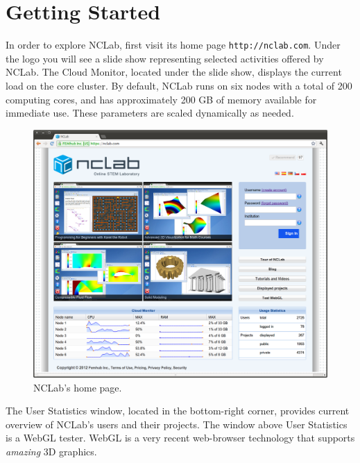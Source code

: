 \documentclass[article,A4,12pt]{llncs}
\begin{document}
\newpage

\section{Getting Started}

In order to explore NCLab, first visit its home page {\tt http://nclab.com}.
Under the logo you will see a slide show representing selected activities 
offered by NCLab. The Cloud Monitor, located under the slide show, displays 
the current load on the core cluster. By default, NCLab runs on six nodes 
with a total of 200 computing cores, and has approximately 200 GB of memory 
available for immediate use. These parameters are scaled dynamically 
as needed. 

\begin{figure}[!ht]
\begin{center}
\includegraphics[width=\textwidth]{img/outside.png}
\end{center}
\vspace{-2mm}
\caption{NCLab's home page.}
\label{fig:outside}
\end{figure}

\noindent
The User Statistics window, located in the 
bottom-right corner, provides current overview of NCLab's users and their projects. 
The window above User Statistics is a WebGL tester. WebGL is a very recent 
web-browser technology that supports {\em amazing} 3D graphics. 
\end{document}
